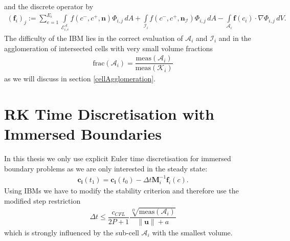 	and the discrete operator by
	\begin{align}
		(\mathbf{f}_i)_j := \sum_{e=1}^{E_i}\int\limits_{\mathcal{E}_{i,e}^\mathcal{A}} f \left( c^-, c^+, \mathbf{n} \right) \Phi_{i,j} \, dA + \int\limits_{\mathcal{I}_{i}} f \left( c^-, c^+, \mathbf{n}_\mathcal{I} \right) \Phi_{i,j} \, dA - \int\limits_{\mathcal{A}_i} \boldsymbol{f}\left(c_i\right) \cdot \nabla\Phi_{i,j} \, dV.
	\end{align}
	The difficulty of the IBM lies in the correct evaluation of $\mathcal{A}_i$ and $\mathcal{I}_i$ and in the agglomeration of intersected cells with very small volume fractions 
	\begin{align}
		\text{frac}(\mathcal{A}_i) = \dfrac{\text{meas}(\mathcal{A}_i)}{\text{meas}(\mathcal{K}_i)}
	\end{align} 
	as we will discuss in section \cref{cellAgglomeration}.
	
	\section{RK Time Discretisation with Immersed Boundaries}
	In this thesis we only use explicit Euler time discretisation for immersed boundary problems as we are only interested in the steady state:
	\begin{align}
		\mathbf{c_i}(t_1) = \mathbf{c_i}(t_0)-\Delta t \mathbf{M}_i^{-1} \mathbf{f}_i (c).
	\end{align}
	Using IBMs we have to modify the stability criterion and therefore use the modified step restriction
	\begin{align}
		\Delta t \leq \dfrac{c_{CFL}}{2P+1} \dfrac{\sqrt[D]{\text{meas}(\mathcal{A}_i)}}{\|\mathbf{u} \| + a}
		\label{timestepIBM}
	\end{align}
	which is strongly influenced by the sub-cell $\mathcal{A}_i$ with the smallest volume.
	
